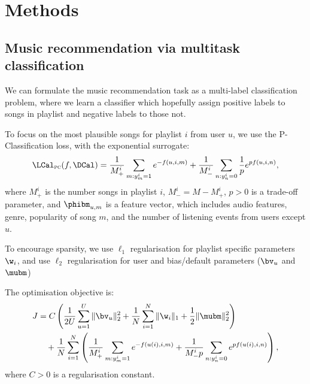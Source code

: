 \section{Methods}

\subsection{Music recommendation via multitask classification}

We can formulate the music recommendation task as a multi-label classification problem,
where we learn a classifier which hopefully assign positive labels to songs in playlist and negative labels to those not.

To focus on the most plausible songs for playlist $i$ from user $u$,
we use the P-Classification loss, with the exponential surrogate:
\begin{equation*}
\begin{aligned}
\LCal_\textsc{pc}(f, \DCal) 
&= \frac{1}{M_+^i} \sum_{m: y_m^i = 1} e^{-f(u, i, m)} + \frac{1}{M_-^i} \sum_{n: y_n^i = 0} \frac{1}{p} e^{p f(u, i, n)}, \\
\end{aligned}
\end{equation*}
where $M_+^i$ is the number songs in playlist $i$,
$M_-^i = M - M_+^i$,
$p > 0$ is a trade-off parameter,
and $\phibm_{u,m}$ is a feature vector,
which includes audio features, genre, popularity of song $m$,
and the number of listening events from users except $u$.

To encourage sparsity, we use $\ell_1$ regularisation for playlist specific parameters $\w_i$, 
and use $\ell_2$ regularisation for user and bias/default parameters (\ie $\bv_u$ and $\mubm$)

The optimisation objective is:
\begin{equation*}
\begin{aligned}
J &= C \left( \frac{1}{2U} \sum_{u=1}^U \| \bv_u \|_2^2
     + \frac{1}{N} \sum_{i=1}^N \| \w_i \|_1 + \frac{1}{2} \| \mubm \|_2^2 \right) \\
& \hspace{1em}
     + \frac{1}{N} \sum_{i=1}^N \left( \frac{1}{M_+^i} \sum_{m: y_m^i = 1} e^{-f(u(i), i,m)} 
     + \frac{1}{M_-^i p} \sum_{n: y_n^i = 0} e^{p f(u(i), i,n)} \right),
\end{aligned}
\end{equation*}
where $C > 0$ is a regularisation constant.

